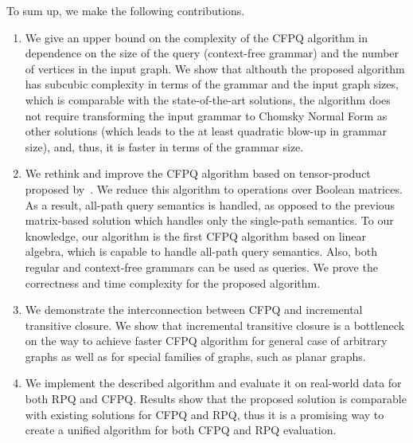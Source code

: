 To sum up, we make the following contributions.
\begin{enumerate}
        \item We give an upper bound on the complexity of the CFPQ algorithm in dependence on the size of the query (context-free grammar) and the number of vertices in the input graph. We show that althouth the proposed algorithm has subcubic complexity in terms of the grammar and the input graph sizes, which is comparable with the state-of-the-art solutions, the algorithm does not require transforming the input grammar to Chomsky Normal Form as other solutions (which leads to the at least quadratic blow-up in grammar size), and, thus, it is faster in terms of the grammar size.
	\item We rethink and improve the CFPQ algorithm based on tensor-product proposed by~\cite{10.1007/978-3-030-54832-2_6}.
	We reduce this algorithm to operations over Boolean matrices.
	As a result, all-path query semantics is handled, as opposed to the previous matrix-based solution which handles only the single-path semantics. To our knowledge, our algorithm is the first CFPQ algorithm based on linear algebra, which is capable to handle all-path query semantics.
	Also, both regular and context-free grammars can be used as queries.
	We prove the correctness and time complexity for the proposed algorithm.
	\item We demonstrate the interconnection between CFPQ and incremental transitive closure.
	We show that incremental transitive closure is a bottleneck on the way to achieve faster CFPQ algorithm for general case of arbitrary graphs as well as for special families of graphs, such as planar graphs.
	\item We implement the described algorithm and evaluate it on real-world data for both RPQ and CFPQ. Results show that the proposed solution is comparable with existing solutions for CFPQ and RPQ, thus it is a promising way to create a unified algorithm for both CFPQ and RPQ evaluation.
\end{enumerate}